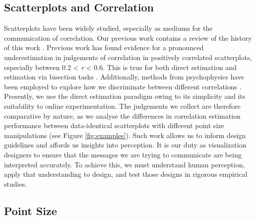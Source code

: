 \documentclass{vgtc}                          %
\begin{document}
\hypertarget{scatterplots-and-correlation}{%
\subsection{Scatterplots and Correlation}\label{scatterplots-and-correlation}}

Scatterplots have been widely studied, especially as mediums for the communication
of correlation. Our previous work contains a review of the history of
this work \cite{strain_2023}. Previous work has found evidence for a
pronounced underestimation in judgements of correlation in positively correlated
scatterplots, especially between 0.2 \textless{} \emph{r} \textless{} 0.6. This
is true for both direct estimation \cite{meyer_1992, collyer_1990} and estimation
via bisection tasks \cite{rensink_2017}. Additionally, methods from psychophysics
have been employed to explore how we discriminate between different correlations
\cite{rensink_2014, rensink_2017}. Presently, we use the direct estimation paradigm owing to its simplicity and its suitability to online experimentation. The judgements we collect are therefore
comparative by nature, as we analyse the differences in correlation estimation performance
between data-identical scatterplots with different point size manipulations (see Figure \ref{fig:examples}).
Such work allows us to inform design guidelines and affords us insights into perception.
It is our duty as visualization designers to ensure that the
messages we are trying to communicate are being interpreted accurately.
To achieve this, we must understand human perception, apply that understanding
to design, and test those designs in rigorous empirical studies.

\hypertarget{point-size}{%
\subsection{Point Size}\label{point-size}}
\end{document}
